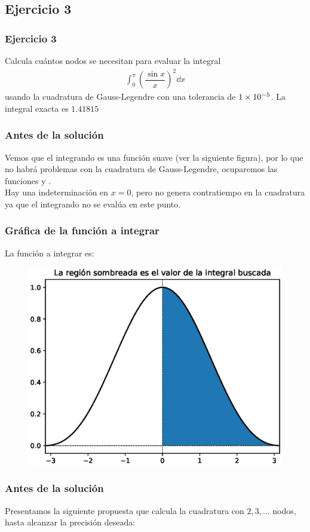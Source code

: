 \subsection*{Ejercicio 3}
\begin{frame}
\frametitle{Ejercicio 3}
Calcula cuántos nodos se necesitan para evaluar la integral
\begin{align*}
\int_{0}^{\pi} \left( \dfrac{\sin x}{x} \right)^{2} \dd{x}
\end{align*}
usando la cuadratura de Gauss-Legendre con una tolerancia de $\num{1d-5}$. La integral exacta es $1.41815$
\end{frame}
\begin{frame}
\frametitle{Antes de la solución}
Vemos que el integrando es una función suave (ver la siguiente figura), por lo que no habrá problemas con la cuadratura de Gauss-Legendre, ocuparemos las funciones  y .
\\
\bigskip
Hay una indeterminación en $x = 0$, pero no genera contratiempo en la cuadratura ya que el integrando no se evalúa en este punto.
\end{frame}
\begin{frame}
\frametitle{Gráfica de la función a integrar}
La función a integrar es:
\begin{figure}[h!]
	\centering
	\includegraphics[scale=0.5]{Imagenes/integracion_Gauss_Legendre_01.eps}
\end{figure}
\end{frame}
\begin{frame}
\frametitle{Antes de la solución}
Presentamos la siguiente propuesta que calcula la cuadratura con $2, 3, \ldots$ nodos, hasta alcanzar la precisión deseada:
\end{frame}

